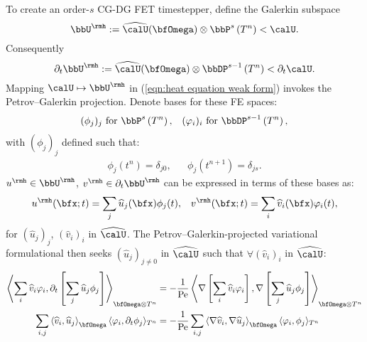 \begin{example}
        To create an order-$s$ CG-DG FET timestepper, define the Galerkin subspace
        \begin{equation}
            \bbU^{\rmh}  :=  \widehat{\calU}(\bfOmega)\otimes\bbP^{s}\left(T^{n}\right)  <  \calU.
        \end{equation}
        Consequently
        \begin{equation}
            \partial_{t}\bbU^{\rmh}  :=  \widehat{\calU}(\bfOmega)\otimes\bbDP^{s - 1}\left(T^{n}\right)  <  \partial_{t}\calU.
        \end{equation}
        Mapping $\calU  \mapsto  \bbU^{\rmh}$ in (\ref{eqn:heat equation weak form}) invokes the Petrov--Galerkin projection. Denote bases for these FE spaces:
        \begin{align}
            (\phi_{j})_{j}     \text{ for }  \bbP^{s}\left(T^{n}\right),         &&
            (\varphi_{i})_{i}  \text{ for }  \bbDP^{s - 1}\left(T^{n}\right),
        \end{align}
        with $(\phi_{j})_{j}$ defined such that:
        \begin{align}
            \phi_{j}\left(t^{n}\right)      =  \delta_{j0},  &&
            \phi_{j}\left(t^{n + 1}\right)  =  \delta_{js}.
        \end{align}
        $u^{\rmh}  \in  \bbU^{\rmh}$, $v^{\rmh}  \in  \partial_{t}\bbU^{\rmh}$ can be expressed in terms of these bases as:
        \begin{align}
            u^{\rmh}(\bfx; t)  =  \sum_{j}\widehat{u}_{j}(\bfx)\phi_{j}(t),  &&
            v^{\rmh}(\bfx; t)  =  \sum_{i}\widehat{v}_{i}(\bfx)\varphi_{i}(t),
        \end{align}
        for $\left(\widehat{u}_{j}\right)_{j}$, $\left(\widehat{v}_{i}\right)_{i}$ in $\widehat{\calU}$. The Petrov--Galerkin-projected variational formulational then seeks $\left(\widehat{u}_{j}\right)_{j \neq 0}$ in $\widehat{\calU}$ such that $\forall  \left(\widehat{v}_{i}\right)_{i}$ in $\widehat{\calU}$:
        \begin{align}
            \left\langle\sum_{i}\widehat{v}_{i}\varphi_{i}, \partial_{t}\left[\sum_{j}\widehat{u}_{j}\phi_{j}\right]\right\rangle_{\bfOmega\otimes T^{n}}  &=  - \frac{1}{\rmPe}\left\langle\nabla\left[\sum_{i}\widehat{v}_{i}\varphi_{i}\right], \nabla\left[\sum_{j}\widehat{u}_{j}\phi_{j}\right]\right\rangle_{\bfOmega\otimes T^{n}}  \\
            \sum_{i, j}\left\langle\widehat{v}_{i}, \widehat{u}_{j}\right\rangle_{\bfOmega}\langle\varphi_{i}, \partial_{t}\phi_{j}\rangle_{T^{n}}  &=  - \frac{1}{\rmPe}\sum_{i, j}\left\langle\nabla\widehat{v}_{i}, \nabla\widehat{u}_{j}\right\rangle_{\bfOmega}\langle\varphi_{i}, \phi_{j}\rangle_{T^{n}}

\end{align}
\end{example}
